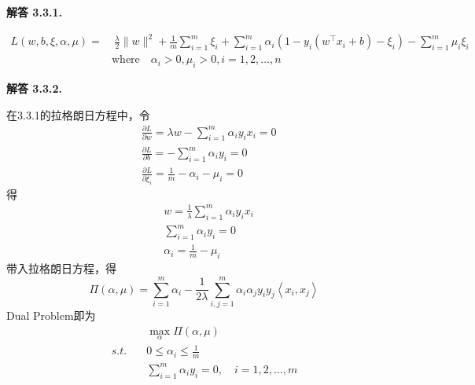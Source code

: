 \documentclass[12pt, a4paper, oneside]{ctexart}
\newenvironment{solution}[1]{\par\noindent\textbf{解答 #1. }\par}{\par}
\begin{document}
\begin{solution}{3.3.1}
    \begin{align}
        L(w, b, \xi, \alpha, \mu) = & \  \frac{\lambda}{2} \| w \|^2 + \frac{1}{m} \sum_{i=1}^{m} \xi_i + \sum_{i=1}^{m} \alpha_i (1 - y_i(w^\top x_i + b) - \xi_i) - \sum_{i=1}^{m} \mu_i \xi_i \nonumber \\
        & \text{where}\quad  \alpha_i > 0, \mu_i > 0, i = 1, 2, \dots, n \nonumber
    \end{align}
\end{solution}

\begin{solution}{3.3.2}
    在3.3.1的拉格朗日方程中，令
    \begin{align}
        & \frac{\partial L}{\partial w} = \lambda w - \sum_{i=1}^{m} \alpha_i y_i x_i = 0 \nonumber \\
        & \frac{\partial L}{\partial b} = -\sum_{i=1}^{m} \alpha_i y_i = 0 \nonumber \\ 
        & \frac{\partial L}{\partial \xi_i} = \frac{1}{m} - \alpha_i - \mu_i = 0 \nonumber
    \end{align}
    得
    \begin{align}
        & w = \frac{1}{\lambda} \sum_{i=1}^{m} \alpha_i y_i x_i \nonumber \\
        & \sum_{i=1}^{m} \alpha_i y_i = 0 \nonumber \\
        & \alpha_i = \frac{1}{m} - \mu_i \nonumber
    \end{align}
    带入拉格朗日方程，得
    \begin{equation}
        \Pi(\alpha, \mu) = \sum_{i=1}^{m} \alpha_i - \frac{1}{2\lambda}\sum_{i,j=1}^{m}\alpha_i \alpha_j y_i y_j \left< x_i, x_j\right> \nonumber
    \end{equation}
    Dual Problem即为
    \begin{align}
        & \max_{\alpha} \Pi(\alpha, \mu) \nonumber \\
        s.t. \quad & 0 \leq \alpha_i \leq \frac{1}{m} \nonumber \\
        \quad \quad & \sum_{i=1}^{m} \alpha_i y_i = 0, \quad i = 1, 2, \dots, m \nonumber
    \end{align}
\end{solution}
\end{document}
